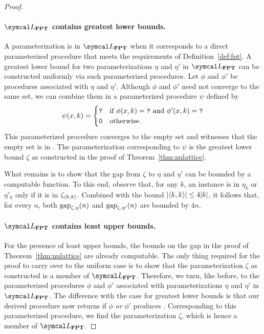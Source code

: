 \begin{proof}
  \paragraph{$\calL_\cl{FPT}$ contains greatest lower bounds.}
  A parameterization is in $\calL_\cl{FPT}$ when it corresponds to a direct parameterized procedure that meets the requirements of Definition~\ref{def:fpt}.
  A greatest lower bound for two parameterizations $\eta$ and $\eta'$ in $\calL_\cl{FPT}$ can be constructed uniformly via such parameterized procedures.
  Let $\phi$ and $\phi'$ be procedures associated with $\eta$ and $\eta'$.
  Although $\phi$ and $\phi'$ need not converge to the same set, we can combine them in a parameterized procedure $\psi$ defined by
  \begin{equation*}
    \psi(x, k) = \begin{cases}
      \textnormal{\texttt{?}}	&\text{if $\phi(x, k) = \textnormal{\texttt{?}}$ and $\phi'(x, k) = \textnormal{\texttt{?}}$} \\
      \textnormal{\texttt{0}}	&\text{otherwise.}
    \end{cases}
  \end{equation*}
  This parameterized procedure converges to the empty set and witnesses that the empty set is in .
  The parameterization corresponding to $\psi$ is the greatest lower bound $\zeta$ as constructed in the proof of Theorem~\ref{thm:nulattice}.

  What remains is to show that the gap from $\zeta$ to $\eta$ and $\eta'$ can be bounded by a computable function.
  To this end, observe that, for any $k$, an instance is in $\eta_k$ or $\eta'_k$ only if it is in $\zeta_{{\langle k, k\rangle}}$.
  Combined with the bound ${\lvert{\langle k, k\rangle}\rvert} \le 4{\lvert k\rvert}$, it follows that, for every $n$, both $\operatorname{gap}_{\zeta, \eta}(n)$ and $\operatorname{gap}_{\zeta, \eta'}(n)$ are bounded by $4n$.

  \paragraph{$\calL_\cl{FPT}$ contains least upper bounds.}
  For the presence of least upper bounds, the bounds on the gap in the proof of Theorem~\ref{thm:nulattice} are already computable.
  The only thing required for the proof to carry over to the uniform case is to show that the parameterization $\zeta$ as constructed is a member of $\calL_\cl{FPT}$.
  Therefore, we turn, like before, to the parameterized procedures $\phi$ and $\phi'$ associated with parameterizations $\eta$ and $\eta'$ in $\calL_\cl{FPT}$.
  The difference with the case for greatest lower bounds is that our derived  procedure now returns  if $\phi$ \emph{or} $\phi'$ produces .
  Corresponding to this parameterized procedure, we find the parameterization $\zeta$, which is hence a member of $\calL_\cl{FPT}$.


\end{proof}
